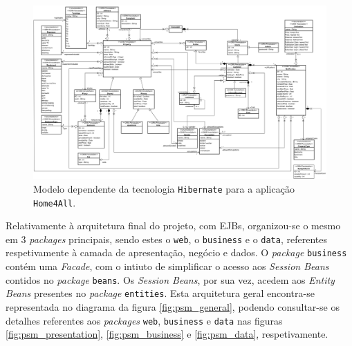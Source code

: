\begin{landscape}
    \begin{figure}[!ht]
        \centering
        \includegraphics[width=1.6\textwidth]{images/PSM.png}
        \caption{Modelo dependente da tecnologia \texttt{Hibernate} para a aplicação \texttt{Home4All}.}
        \label{fig:psm_hibernate}
    \end{figure}
\end{landscape}

Relativamente à arquitetura final do projeto, com EJBs, organizou-se o mesmo em 3 \textit{packages} principais, sendo estes o \texttt{web}, o \texttt{business} e o \texttt{data}, referentes respetivamente à camada de apresentação, negócio e dados. O \textit{package} \texttt{business} contém uma \textit{Facade}, com o intiuto de simplificar o acesso aos \textit{Session Beans} contidos no \textit{package} \texttt{beans}. Os \textit{Session Beans}, por sua vez, acedem aos \textit{Entity Beans} presentes no \textit{package} \texttt{entities}. Esta arquitetura geral encontra-se representada no diagrama da figura \ref{fig:psm_general}, podendo consultar-se os detalhes referentes aos \textit{packages} \texttt{web}, \texttt{business} e \texttt{data} nas figuras \ref{fig:psm_presentation}, \ref{fig:psm_business} e \ref{fig:psm_data}, respetivamente.

